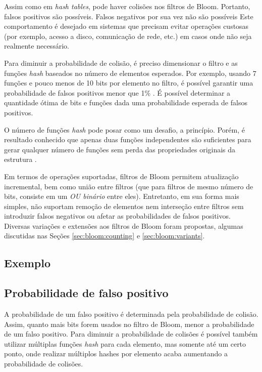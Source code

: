 Assim como em \emph{hash tables}, pode haver colisões nos filtros de Bloom. Portanto, falsos positivos são possíveis. Falsos negativos por sua vez não são possíveis Este comportamento é desejado em sistemas que precisam evitar operações custosas (por exemplo, acesso a disco, comunicação de rede, etc.) em casos onde não seja realmente necessário. 

Para diminuir a probabilidade de colisão, é preciso dimensionar o filtro e as funções \emph{hash} baseados no número de elementos esperados. Por exemplo, usando 7 funções e pouco menos de 10 bits por elemento no filtro, é possível garantir uma probabilidade de falsos positivos menor que 1\% \cite{bonomi2006improved}. É possível determinar a quantidade ótima de bits e funções dada uma probabilidade esperada de falsos positivos.

O número de funções \emph{hash} pode posar como um desafio, a princípio. Porém, é resultado conhecido que apenas duas funções independentes são suficientes para gerar qualquer número de funções sem perda das propriedades originais da estrutura \cite{kirsch2006less}.

Em termos de operações suportadas, filtros de Bloom permitem atualização incremental, bem como união entre filtros (que para filtros de mesmo número de bits, consiste em um \emph{OU binário} entre eles). Entretanto, em sua forma mais simples, não suportam remoção de elementos nem interseção entre filtros sem introduzir falsos negativos ou afetar as probabilidades de falsos positivos. Diversas variações e extensões aos filtros de Bloom foram propostas, algumas discutidas nas Seções \ref{sec:bloom:counting} e \ref{sec:bloom:variants}.

\subsection{Exemplo}\label{sec:bloom:example}


\subsection{Probabilidade de falso positivo}\label{sec:bloom:false}

A probabilidade de um falso positivo é determinada pela probabilidade de colisão. Assim, quanto mais bits forem usados no filtro de Bloom, menor a probabilidade de um falso positivo. Para diminuir a probabilidade de colisões é possível também utilizar múltiplas funções \emph{hash} para cada elemento, mas somente até um certo ponto, onde realizar múltiplos hashes por elemento acaba aumentando a probabilidade de colisões.

